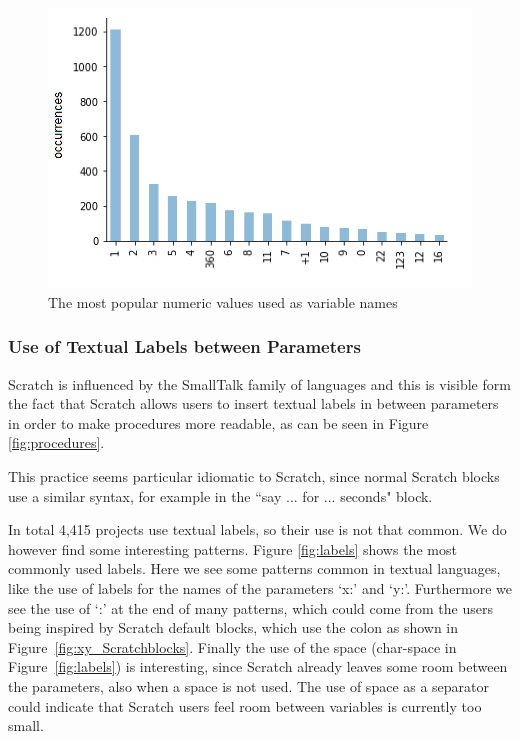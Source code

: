 \documentclass[conference]{IEEEtran}
\begin{document}
\begin{figure}
	\begin{center}
		\includegraphics[width=\columnwidth]{fig/numeric_as_vars_occurrences}
		\caption{The most popular numeric values used as variable names}
		\label{fig:numeric}
	\end{center}
\end{figure} 

\subsubsection{Use of Textual Labels between Parameters}
Scratch is influenced by the SmallTalk family of languages and this is visible form the fact that Scratch allows users to insert textual labels in between parameters in order to make procedures more readable, as can be seen in Figure \ref{fig:procedures}.

This practice seems particular idiomatic to Scratch, since normal Scratch blocks use a similar syntax, for example in the ``say ... for ... seconds" block. 

In total 4,415 projects use textual labels, so their use is not that common. We do however find some interesting patterns. Figure \ref{fig:labels} shows the most commonly used labels. Here we see some patterns common in textual languages, like the use of labels for the names of the parameters `x:' and `y:'. Furthermore we see the use of `:' at the end of many patterns, which could come from the users being inspired by Scratch default blocks, which use the colon as shown in Figure~\ref{fig:xy_Scratchblocks}. Finally the use of the space (char-space in Figure~\ref{fig:labels}) is interesting, since Scratch already leaves some room between the parameters, also when a space is not used. The use of space as a separator could indicate that Scratch users feel room between variables is currently too small.
\end{document}
